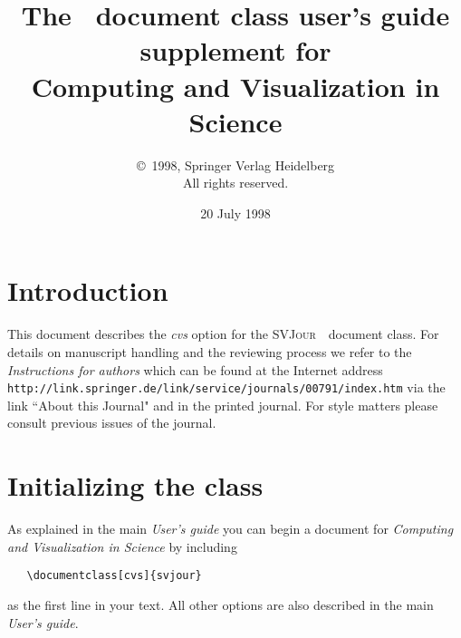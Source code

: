 \documentclass[draft]{ltxguide}[1995/11/28]
\title{The \SJour\ document class user's guide\\supplement
for\\Computing and Visualization in Science}
\author{\copyright~1998, Springer Verlag Heidelberg\\
   All rights reserved.}
\date{20 July 1998}
\newcommand{\SJour}{\textsc{SVJour}}
\begin{document}
\maketitle

\section{Introduction}
\label{sec:intro}
This document describes the \textit{cvs} option for the \SJour\
\LaTeXe\ document class. For details on manuscript handling and the
reviewing process we refer to the \emph{Instructions for authors} which
can be found at the Internet address
\texttt{http://link.springer.de/link/service/journals/00791/index.htm}
via the link ``About this Journal" and in the printed journal. For style
matters please consult previous issues of the journal.

\section{Initializing the class} \label{sec:opt}

As explained in the main \emph{User's guide} you can begin a document
for \emph{Computing and Visualization in Science} by including
\begin{verbatim}
   \documentclass[cvs]{svjour}
\end{verbatim}
as the first line in your text. All other options are also described
in the main \emph{User's guide}.
\end{document}
